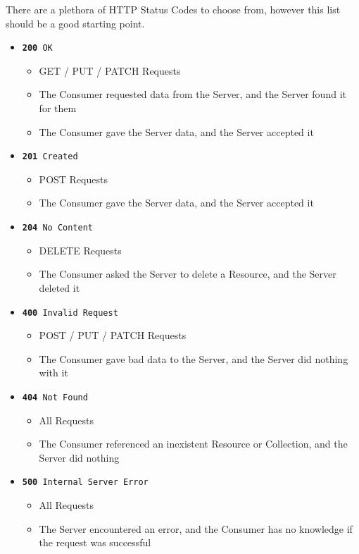 \documentclass{book}
\begin{document}
There are a plethora of HTTP Status Codes \cite{RFC2616} to choose from, however this list should be a good starting point.

\begin{itemize}
\item \texttt{\textbf{200} OK}
    \begin{itemize}
    \item GET / PUT / PATCH  Requests
    \item The Consumer requested data from the Server, and the Server found it for them
    \item The Consumer gave the Server data, and the Server accepted it
    \end{itemize}
\item \texttt{\textbf{201} Created}
    \begin{itemize}
    \item POST Requests
    \item The Consumer gave the Server data, and the Server accepted it
    \end{itemize}
\item \texttt{\textbf{204} No Content}
    \begin{itemize}
    \item DELETE Requests
    \item The Consumer asked the Server to delete a Resource, and the Server deleted it
    \end{itemize}
\item \texttt{\textbf{400} Invalid Request}
    \begin{itemize}
    \item POST / PUT / PATCH Requests
    \item The Consumer gave bad data to the Server, and the Server did nothing with it
    \end{itemize}
\item \texttt{\textbf{404} Not Found}
    \begin{itemize}
    \item All Requests
    \item The Consumer referenced an inexistent Resource or Collection, and the Server did nothing
    \end{itemize}
\item \texttt{\textbf{500} Internal Server Error}
    \begin{itemize}
    \item All Requests
    \item The Server encountered an error, and the Consumer has no knowledge if the request was successful
    \end{itemize}
\end{itemize}
\end{document}
